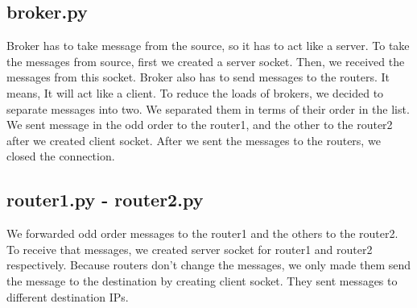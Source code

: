 \documentclass[conference]{IEEEtran}
\begin{document}
\subsection{broker.py}
Broker has to take message from the source, so it has to act like a server. To take the messages from source, first we created a server socket. Then, we received the messages from this socket. Broker also has to send messages to the routers. It means, It will act like a client. To reduce the loads of brokers, we decided to separate messages into two. We separated them in terms of their order in the list. We sent message in the odd order to the router1, and the other to the router2 after we created client socket. After we sent the messages to the routers, we closed the connection.

\subsection{router1.py - router2.py}
We forwarded odd order messages to the router1 and the others to the router2. To receive that messages, we created server socket for router1 and router2 respectively. Because routers don't change the messages, we only made them send the message to the destination by creating client socket. They sent messages to different destination IPs.
\end{document}
